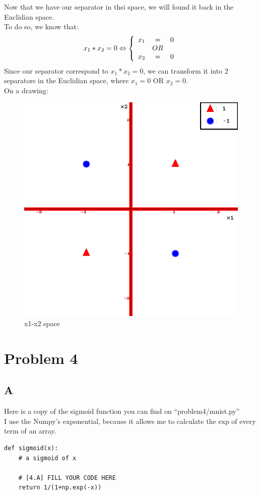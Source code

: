 \documentclass{article}
\begin{document}
            Now that we have our separator in thsi space, we will found it back in the Euclidian space.\\
            To do so, we know that:\\
            \[
                x_1*x_2=0 \Leftrightarrow\left\{
                    \begin{array}{r c l}
                        x_1 &=& 0\\
                        & OR & \\
                        x_2 &=& 0
                    \end{array}
                \right.
            \]
            Since our separator correspond to $x_1*x_2=0$, we can transform it into 2 separators in the Euclidian space, where $x_1=0$ OR $x_2=0$.\\
            On a drawing:
            \begin{figure}[H]
                \centering
                \includegraphics[scale=0.5]{problem3/x1-x2.png}
                \caption{x1-x2 space}
            \end{figure}
    \newpage
    \section{Problem 4}
        \subsection{A}
            Here is a copy of the sigmoid function you can find on ``problem4/mnist.py''\\
            I use the Numpy's exponential, because it allows me to calculate the exp of every term of an array.
            \begin{verbatim}
def sigmoid(x):
    # a sigmoid of x

    # [4.A] FILL YOUR CODE HERE
    return 1/(1+np.exp(-x))
            \end{verbatim}
\end{document}
